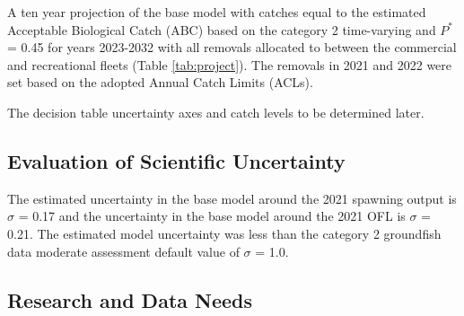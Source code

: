 \documentclass[11pt,
  english,
  a4paper,
]{article}
\begin{document}

A ten year projection of the base model with catches equal to the estimated Acceptable Biological Catch (ABC) based on the category 2 time-varying and {\(P^*\)\leavevmode\tagmcend\tagstructend} = 0.45 for years 2023-2032 with all removals allocated to between the commercial and recreational fleets (Table \ref{tab:project}). The removals in 2021 and 2022 were set based on the adopted Annual Catch Limits (ACLs).

\leavevmode\tagmcend\tagstructend\par


The decision table uncertainty axes and catch levels to be determined later.

\leavevmode\tagmcend\tagstructend\par


\hypertarget{evaluation-of-scientific-uncertainty}{%
\subsection{Evaluation of Scientific Uncertainty}\label{evaluation-of-scientific-uncertainty}}

\leavevmode\tagmcend\tagstructend


The estimated uncertainty in the base model around the 2021 spawning output is {\(\sigma\)\leavevmode\tagmcend\tagstructend} = 0.17 and the uncertainty in the base model around the 2021 OFL is {\(\sigma\)\leavevmode\tagmcend\tagstructend} = 0.21. The estimated model uncertainty was less than the category 2 groundfish data moderate assessment default value of {\(\sigma\)\leavevmode\tagmcend\tagstructend} = 1.0.

\leavevmode\tagmcend\tagstructend\par


\hypertarget{research-and-data-needs}{%
\subsection{Research and Data Needs}\label{research-and-data-needs}}
\end{document}

